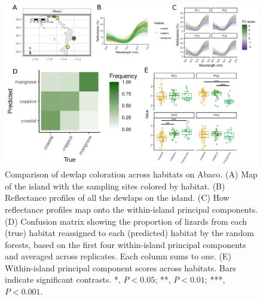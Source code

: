 
\begin{figure}[H]
	\centering
	\includegraphics[width=\textwidth]{figures/Abaco_2.2.png}
	\caption{Comparison of dewlap coloration across habitats on Abaco. (A) Map of the island with the sampling sites colored by habitat. (B) Reflectance profiles of all the dewlaps on the island. (C) How reflectance profiles map onto the within-island principal components. (D) Confusion matrix showing the proportion of lizards from each (true) habitat reassigned to each (predicted) habitat by the random forests, based on the first four within-island principal components and averaged across replicates. Each column sums to one. (E) Within-island principal component scores across habitats. Bars indicate significant contrasts. *, $P < 0.05$; **, $P < 0.01$; ***, $P < 0.001$.}
	\label{fig:Abaco}
\end{figure}